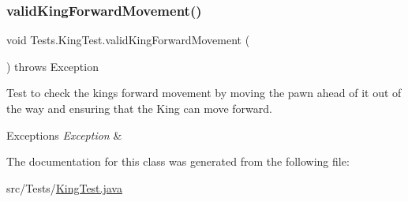 \subsubsection{\texorpdfstring{valid\+King\+Forward\+Movement()}{validKingForwardMovement()}}
{\footnotesize\ttfamily void Tests.\+King\+Test.\+valid\+King\+Forward\+Movement (\begin{DoxyParamCaption}{ }\end{DoxyParamCaption}) throws Exception}

Test to check the king\textquotesingle{}s forward movement by moving the pawn ahead of it out of the way and ensuring that the King can move forward. 
\begin{DoxyExceptions}{Exceptions}
{\em Exception} & \\
\hline
\end{DoxyExceptions}


The documentation for this class was generated from the following file\+:\begin{DoxyCompactItemize}
\item 
src/\+Tests/\hyperlink{_king_test_8java}{King\+Test.\+java}\end{DoxyCompactItemize}
